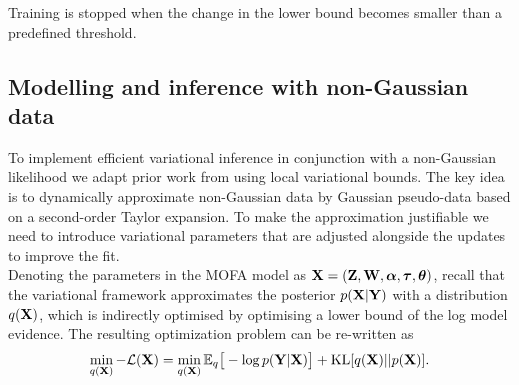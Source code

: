 Training is stopped when the change in the lower bound becomes smaller than a predefined threshold.



\subsection{Modelling and inference with non-Gaussian data} \label{section:mofa_ngaussian}

To implement efficient variational inference in conjunction with a non-Gaussian likelihood we adapt prior work from \cite{Seeger2012} using local variational bounds. The key idea is to dynamically approximate non-Gaussian data by Gaussian pseudo-data based on a second-order Taylor expansion.  To make the approximation justifiable we need to introduce variational parameters that are adjusted alongside the updates to improve the fit.	\\
Denoting the parameters in the MOFA model as ${\bf X}= ({\bf Z},{\bf W},\mbox{\boldmath $\alpha$},\mbox{\boldmath $\tau$},\mbox{\boldmath $\theta$})$, recall that the variational framework approximates the posterior $p({\bf X} | {\bf Y} )$ with a distribution $q({\bf X})$, which is indirectly optimised by optimising a lower bound of the log model evidence. The resulting optimization problem can be re-written as
\begin{equation*}
\min_{q({\bf X})} -\mathcal{L}({\bf X}) =  \min_{q({\bf X})} \mathbb{E}_q \big[ -\log p({\bf Y}|{\bf X}) \big] + {\rm KL}[q({\bf X})||p({\bf X})].
\end{equation*}

